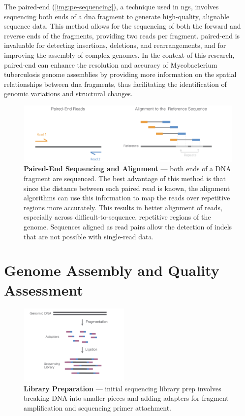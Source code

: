 The \gls{paired-end} (\autoref{img:pe-sequencing}), a technique used in \gls{ngs}, involves sequencing both ends of a \gls{dna} fragment to generate high-quality, alignable sequence data. This method allows for the \gls{sequencing} of both the forward and reverse ends of the fragments, providing two \gls{read}s per fragment. \gls{paired-end} is invaluable for detecting insertions, deletions, and rearrangements, and for improving the \gls{assembly} of complex \gls{genome}s. In the context of this research, \gls{paired-end} can enhance the resolution and accuracy of Mycobacterium tuberculosis genome assemblies by providing more information on the spatial relationships between \gls{dna} fragments, thus facilitating the identification of genomic variations and structural changes.


\begin{figure}[ht]
  \centering
  \includegraphics[width=\textwidth]{resources/images/paired-end (PE) sequencing.png}
  \caption{\textbf{Paired-End Sequencing and Alignment} \cite{Illumina2017-PE} — both ends of a DNA fragment are sequenced. The best advantage of this method is that since the distance between each paired read is known, the alignment algorithms can use this information to map the reads over repetitive regions more accurately. This results in better alignment of reads, especially across difficult-to-sequence, repetitive regions of the genome. Sequences aligned as read pairs allow the detection of indels that are not possible with single-read data.}
  \label{img:pe-sequencing}
\end{figure}

\section{Genome Assembly and Quality Assessment}


\begin{figure}
  \centering
  \includegraphics[width=0.48\textwidth]{resources/images/Library Preparation.png}
  \caption{\textbf{Library Preparation} \cite{Illumina2017-LP} — initial sequencing library prep involves breaking DNA into smaller pieces and adding adapters for fragment amplification and sequencing primer attachment.}
  \label{img:library-preparation}
\end{figure}


